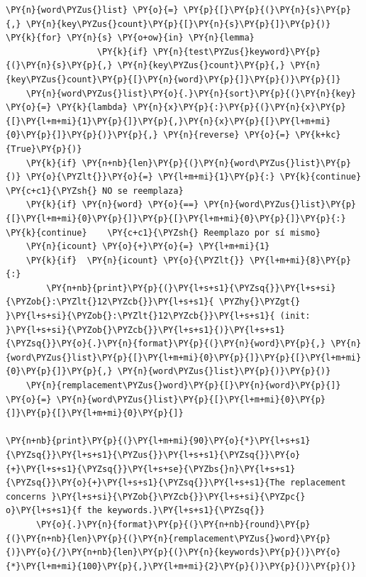 \begin{tcolorbox}[breakable, size=fbox, boxrule=1pt, pad at break*=1mm,colback=cellbackground, colframe=cellborder]
\begin{Verbatim}[commandchars=\\\{\}]
    \PY{n}{word\PYZus{}list} \PY{o}{=} \PY{p}{[}\PY{p}{(}\PY{n}{s}\PY{p}{,} \PY{n}{key\PYZus{}count}\PY{p}{[}\PY{n}{s}\PY{p}{]}\PY{p}{)} \PY{k}{for} \PY{n}{s} \PY{o+ow}{in} \PY{n}{lemma} 
                  \PY{k}{if} \PY{n}{test\PYZus{}keyword}\PY{p}{(}\PY{n}{s}\PY{p}{,} \PY{n}{key\PYZus{}count}\PY{p}{,} \PY{n}{key\PYZus{}count}\PY{p}{[}\PY{n}{word}\PY{p}{]}\PY{p}{)}\PY{p}{]}
    \PY{n}{word\PYZus{}list}\PY{o}{.}\PY{n}{sort}\PY{p}{(}\PY{n}{key} \PY{o}{=} \PY{k}{lambda} \PY{n}{x}\PY{p}{:}\PY{p}{(}\PY{n}{x}\PY{p}{[}\PY{l+m+mi}{1}\PY{p}{]}\PY{p}{,}\PY{n}{x}\PY{p}{[}\PY{l+m+mi}{0}\PY{p}{]}\PY{p}{)}\PY{p}{,} \PY{n}{reverse} \PY{o}{=} \PY{k+kc}{True}\PY{p}{)}    
    \PY{k}{if} \PY{n+nb}{len}\PY{p}{(}\PY{n}{word\PYZus{}list}\PY{p}{)} \PY{o}{\PYZlt{}}\PY{o}{=} \PY{l+m+mi}{1}\PY{p}{:} \PY{k}{continue}       \PY{c+c1}{\PYZsh{} NO se reemplaza}
    \PY{k}{if} \PY{n}{word} \PY{o}{==} \PY{n}{word\PYZus{}list}\PY{p}{[}\PY{l+m+mi}{0}\PY{p}{]}\PY{p}{[}\PY{l+m+mi}{0}\PY{p}{]}\PY{p}{:} \PY{k}{continue}    \PY{c+c1}{\PYZsh{} Reemplazo por sí mismo}
    \PY{n}{icount} \PY{o}{+}\PY{o}{=} \PY{l+m+mi}{1}
    \PY{k}{if}  \PY{n}{icount} \PY{o}{\PYZlt{}} \PY{l+m+mi}{8}\PY{p}{:}
        \PY{n+nb}{print}\PY{p}{(}\PY{l+s+s1}{\PYZsq{}}\PY{l+s+si}{\PYZob{}:\PYZlt{}12\PYZcb{}}\PY{l+s+s1}{ \PYZhy{}\PYZgt{} }\PY{l+s+si}{\PYZob{}:\PYZlt{}12\PYZcb{}}\PY{l+s+s1}{ (init: }\PY{l+s+si}{\PYZob{}\PYZcb{}}\PY{l+s+s1}{)}\PY{l+s+s1}{\PYZsq{}}\PY{o}{.}\PY{n}{format}\PY{p}{(}\PY{n}{word}\PY{p}{,} \PY{n}{word\PYZus{}list}\PY{p}{[}\PY{l+m+mi}{0}\PY{p}{]}\PY{p}{[}\PY{l+m+mi}{0}\PY{p}{]}\PY{p}{,} \PY{n}{word\PYZus{}list}\PY{p}{)}\PY{p}{)}    
    \PY{n}{remplacement\PYZus{}word}\PY{p}{[}\PY{n}{word}\PY{p}{]} \PY{o}{=} \PY{n}{word\PYZus{}list}\PY{p}{[}\PY{l+m+mi}{0}\PY{p}{]}\PY{p}{[}\PY{l+m+mi}{0}\PY{p}{]}

\PY{n+nb}{print}\PY{p}{(}\PY{l+m+mi}{90}\PY{o}{*}\PY{l+s+s1}{\PYZsq{}}\PY{l+s+s1}{\PYZus{}}\PY{l+s+s1}{\PYZsq{}}\PY{o}{+}\PY{l+s+s1}{\PYZsq{}}\PY{l+s+se}{\PYZbs{}n}\PY{l+s+s1}{\PYZsq{}}\PY{o}{+}\PY{l+s+s1}{\PYZsq{}}\PY{l+s+s1}{The replacement concerns }\PY{l+s+si}{\PYZob{}\PYZcb{}}\PY{l+s+si}{\PYZpc{} o}\PY{l+s+s1}{f the keywords.}\PY{l+s+s1}{\PYZsq{}}
      \PY{o}{.}\PY{n}{format}\PY{p}{(}\PY{n+nb}{round}\PY{p}{(}\PY{n+nb}{len}\PY{p}{(}\PY{n}{remplacement\PYZus{}word}\PY{p}{)}\PY{o}{/}\PY{n+nb}{len}\PY{p}{(}\PY{n}{keywords}\PY{p}{)}\PY{o}{*}\PY{l+m+mi}{100}\PY{p}{,}\PY{l+m+mi}{2}\PY{p}{)}\PY{p}{)}\PY{p}{)}
\end{Verbatim}
\end{tcolorbox}

